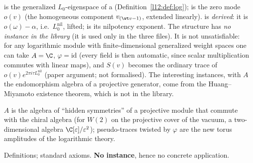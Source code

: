 \begin{dictionary}
 is the generalized $L_0$-eigenspace of a  (Definition~\ref{l12:def:log});
 is the zero mode $o(v)$ (the homogeneous component $v_{(\wt v-1)}$, extended linearly).
 is \emph{derived}: it is $o(\omega)-\alpha$, i.e.\ $L_0^{\mathrm{nil}}$, lifted; 
is its nilpotency exponent. The structure has \emph{no instance in the library} (it is used only in the three
 files). It is not unsatisfiable: for any logarithmic module with
finite-dimensional generalized weight spaces one can take $A=\C$, $\varphi=\mathrm{id}$ (every field is then
automatic, since scalar multiplication commutes with linear maps), and $S(v)$ becomes the ordinary trace of
$o(v)e^{2\pi i\tau L_0^{\mathrm{nil}}}$ (paper argument; not formalised). The interesting instances, with $A$ the
endomorphism algebra of a projective generator, come from the Huang--Miyamoto existence theorem, which is not in the
library.
\end{dictionary}
\begin{physics}
$A$ is the algebra of ``hidden symmetries'' of a projective module that commute with the chiral algebra (for
$W(2)$ on the projective cover of the vacuum, a two-dimensional algebra $\C[\varepsilon]/\varepsilon^2$); pseudo-traces
twisted by $\varphi$ are the new torus amplitudes of the logarithmic theory.
\end{physics}
\begin{status}
Definitions; standard axioms. \textbf{No instance}, hence no concrete application.
\end{status}

